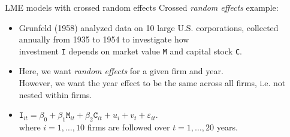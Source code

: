 \documentclass{beamer}
\begin{document}
\begin{frame}{LME models with crossed random effects}
Crossed \textit{random effects} example:\\
\medskip
\begin{itemize}
\item Grunfeld (1958) analyzed data on 10 large U.S. corporations,
collected annually from 1935 to 1954 to investigate how \\investment \texttt{I} depends on market value \texttt{M} and capital stock \texttt{C}.\\
\medskip
\item Here, we want \textit{random effects} for a given firm and year.\\
\smallskip
However, we want the year effect to be the same across all firms, i.e. not nested within firms.
\bigskip
\item $\texttt{I}_{it} = \beta_0 + \beta_1 \texttt{M}_{it} 
+ \beta_2 \texttt{C}_{it} + u_i + v_t + \varepsilon_{it}.$\\
\medskip
where $i=1, \dots, 10$ firms are followed over $t=1,\dots,20$ years.
\end{itemize}
\end{frame}
\end{document}
